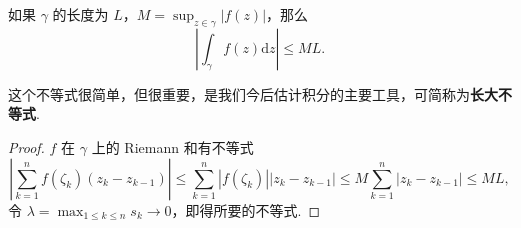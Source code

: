 \documentclass[../../main.tex]{subfiles}
\begin{document}
\begin{proposition}[长大不等式]\label{proposition:长大不等式}
如果 \( \gamma \) 的长度为 \( L \)，\( M = \sup_{z \in \gamma} |f(z)| \)，那么
\[
\left| \int_\gamma f(z)\mathrm{d}z \right| \leqslant ML. \tag{4}
\]
\end{proposition}
\begin{remark}
这个不等式很简单，但很重要，是我们今后估计积分的主要工具，可简称为\textbf{长大不等式}.
\end{remark}
\begin{proof}
\( f \) 在 \( \gamma \) 上的 Riemann 和有不等式
\[
\left| \sum_{k = 1}^n f(\zeta_k)(z_k - z_{k - 1}) \right| \leqslant \sum_{k = 1}^n |f(\zeta_k)| |z_k - z_{k - 1}|
\leqslant M \sum_{k = 1}^n |z_k - z_{k - 1}|
\leqslant ML,
\]
令 \( \lambda = \max_{1 \leqslant k \leqslant n} s_k \to 0 \)，即得所要的不等式.

\end{proof}
\end{document}
